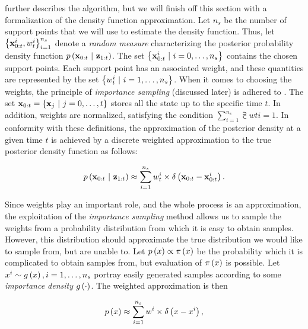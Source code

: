 \cite{Arulampalam2007} further describes the algorithm, but we will finish off this section with a formalization of the density function approximation. Let $n_s$ be the number of support points that we will use to estimate the density function. Thus, let ${\left\{ {{\mathbf{x}}_{0:t}^{i}, {w}_{t}^{i}} \right\}}_{i = 1}^{n_s}$ denote a \emph{random measure} characterizing the posterior probability density function $p \left( \mathbf{x}_{0:t} \ | \ \mathbf{z}_{1:t} \right)$. The set $\left\{ {{\mathbf{x}}_{0:t}^{i} \ | \ i = 0, \dots, n_s} \right\}$ contains the chosen support points. Each support point has an associated weight, and these quantities are represented by the set $\left\{ {{w}_{t}^{i} \ | \ i = 1, \dots, n_s} \right\}$. When it comes to choosing the weights, the principle of \emph{importance sampling} (discussed later) is adhered to \cite{bergman1999recursive, stordal2008sequential}. The set $\vect{x}_{0:t} = \cbrackets{\vect{x}_j \ | \ j = 0, \dots, t}$ stores all the state up to the specific time $t$. In addition, weights are normalized, satisfying the condition $\sum_{i = 1}^{n_s} \supsub{w}{t}{i} = 1$. In conformity with these definitions, the approximation of the posterior density at a given time $t$ is achieved by a discrete weighted approximation to the true posterior density function as follows:

\begin{equation}
    p \left( \mathbf{x}_{0:t} \ | \ \mathbf{z}_{1:t} \right) \approx \sum_{i = 1}^{n_s} {w}_{t}^{i} \times {\delta} \left( \mathbf{x}_{0:t} - {\mathbf{x}}_{0:t}^{i} \right).
\end{equation}

Since weights play an important role, and the whole process is an approximation, the exploitation of the \emph{importance sampling} method allows us to sample the weights from a probability distribution from which it is easy to obtain samples. However, this distribution should approximate the true distribution we would like to sample from, but are unable to. Let $p \left( x \right) \propto {\pi} \left( x \right)$ be the probability which it is complicated to obtain samples from, but evaluation of ${\pi} \left( x \right)$ is possible. Let $x^i \sim {g} \left( x \right), i = 1, \dots, n_s$ portray easily generated samples according to some \emph{importance density} ${g} \left( \cdot \right)$. The weighted approximation is then

\begin{equation}
    p \left( x \right) \approx \sum_{i = 1}^{n_s} w^i \times {\delta} \left( x - x^i \right),
\end{equation}

